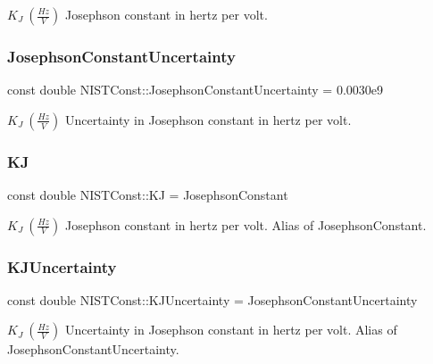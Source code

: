 $K_J \ (\frac{Hz}{V})$ Josephson constant in hertz per volt. \mbox{\label{group___josephson_constant_gaa10eadf7c1811f94c5b5725ad300a099}} 
\subsubsection{\texorpdfstring{Josephson\+Constant\+Uncertainty}{JosephsonConstantUncertainty}}
{\footnotesize\ttfamily const double N\+I\+S\+T\+Const\+::\+Josephson\+Constant\+Uncertainty = 0.\+0030e9}

$K_J \ (\frac{Hz}{V})$ Uncertainty in Josephson constant in hertz per volt. \mbox{\label{group___josephson_constant_ga75e8a1fd7b1434083e96c2f0291eb756}} 
\subsubsection{\texorpdfstring{KJ}{KJ}}
{\footnotesize\ttfamily const double N\+I\+S\+T\+Const\+::\+KJ = Josephson\+Constant}

$K_J \ (\frac{Hz}{V})$ Josephson constant in hertz per volt. Alias of Josephson\+Constant. \mbox{\label{group___josephson_constant_ga8501536b42a3f29278ec30b3bf054321}} 
\subsubsection{\texorpdfstring{K\+J\+Uncertainty}{KJUncertainty}}
{\footnotesize\ttfamily const double N\+I\+S\+T\+Const\+::\+K\+J\+Uncertainty = Josephson\+Constant\+Uncertainty}

$K_J \ (\frac{Hz}{V})$ Uncertainty in Josephson constant in hertz per volt. Alias of Josephson\+Constant\+Uncertainty. 